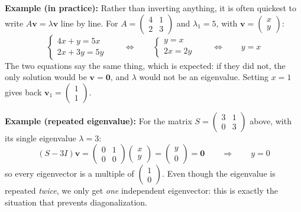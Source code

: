 \documentclass[]{article}
\begin{document}
	\noindent \textbf{Example (in practice):}
	Rather than inverting anything, it is often quickest to write $A\mathbf{v} = \lambda \mathbf{v}$ line by line.
	For $A = \begin{pmatrix} 4 & 1 \\ 2 & 3 \end{pmatrix}$ and $\lambda_1 = 5$, with $\mathbf{v} = \begin{pmatrix} x \\ y \end{pmatrix}$:
	$$
	\begin{cases}
		4x + y = 5x \\
		2x + 3y = 5y
	\end{cases}
	\qquad \Longleftrightarrow \qquad
	\begin{cases}
		y = x \\
		2x = 2y
	\end{cases}
	\qquad \Longleftrightarrow \qquad
	y = x
	$$
	The two equations say the same thing, which is expected: if they did not, the only solution would be $\mathbf{v} = \mathbf{0}$, and $\lambda$ would not be an eigenvalue.
	Setting $x = 1$ gives back $\mathbf{v}_1 = \begin{pmatrix} 1 \\ 1 \end{pmatrix}$.

	\noindent \textbf{Example (repeated eigenvalue):}
	For the matrix $S = \begin{pmatrix} 3 & 1 \\ 0 & 3 \end{pmatrix}$ above, with its single eigenvalue $\lambda = 3$:
	$$
	(S - 3I)\mathbf{v} = \begin{pmatrix} 0 & 1 \\ 0 & 0 \end{pmatrix}\begin{pmatrix} x \\ y \end{pmatrix} = \begin{pmatrix} y \\ 0 \end{pmatrix} = \mathbf{0}
	\qquad \Longrightarrow \qquad
	y = 0
	$$
	so every eigenvector is a multiple of $\begin{pmatrix} 1 \\ 0 \end{pmatrix}$.
	Even though the eigenvalue is repeated \textit{twice}, we only get \textit{one} independent eigenvector: this is exactly the situation that prevents diagonalization.
	
\end{document}
